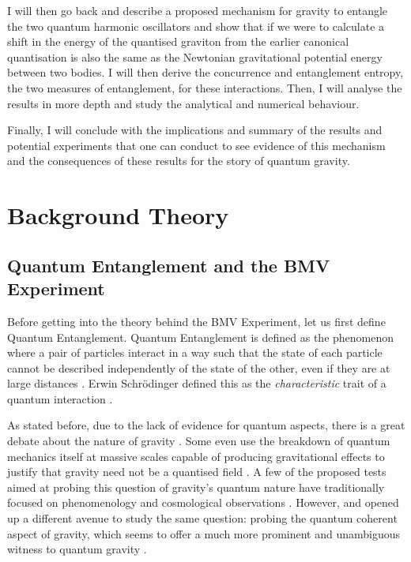 \documentclass[12pt,a4paper]{report}
\theoremstyle{plain}
\theoremstyle{definition}
\theoremstyle{remark}
\begin{document}
I will then go back and describe a proposed mechanism for gravity to entangle the two quantum harmonic oscillators and show that if we were to calculate a shift in the energy of the quantised graviton from the earlier canonical quantisation is also the same as the Newtonian gravitational potential energy between two bodies. I will then derive the concurrence \cite{Bose_2022} and entanglement entropy, the two measures of entanglement, for these interactions. Then, I will analyse the results in more depth and study the analytical and numerical behaviour.

Finally, I will conclude with the implications and summary of the results and potential experiments that one can conduct to see evidence of this mechanism and the consequences of these results for the story of quantum gravity.

\newpage
\chapter{Background Theory}
\section{Quantum Entanglement and the BMV Experiment}
Before getting into the theory behind the BMV Experiment, let us first define Quantum Entanglement. Quantum Entanglement is defined as the phenomenon where a pair of particles interact in a way such that the state of each particle cannot be described independently of the state of the other, even if they are at large distances \cite{schrodinger_1935}. Erwin Schr\"odinger defined this as the \textit{characteristic} trait of a quantum interaction \cite{schrodinger_1935}. 

As stated before, due to the lack of evidence for quantum aspects, there is a great debate about the nature of gravity \cite{Bose_2017, fdysongraviton}. Some even use the breakdown of quantum mechanics itself at massive scales capable of producing gravitational effects to justify that gravity need not be a quantised field \cite{penrose}. A few of the proposed tests aimed at probing this question of gravity's quantum nature have traditionally focused on phenomenology and cosmological observations \cite{Bose_2017, Hossenfelder_2012}. However, \citet{Bose_2017} and \citet{Marletto_2017} opened up a different avenue to study the same question: probing the quantum coherent aspect of gravity, which seems to offer a much more prominent and unambiguous witness to quantum gravity \cite{Bose_2017}.
\end{document}
